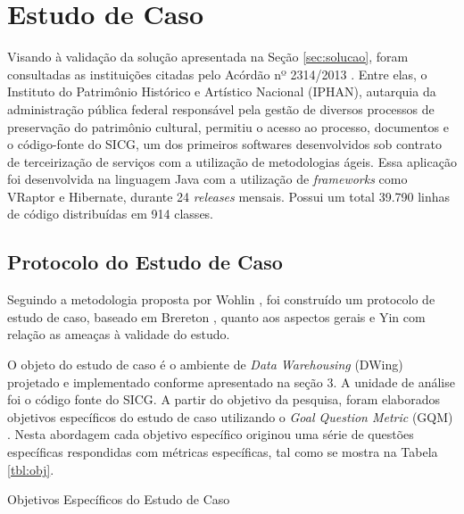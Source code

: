 \section {Estudo de Caso}

Visando à validação da solução apresentada na Seção \ref{sec:solucao}, foram consultadas as instituições citadas pelo Acórdão nº 2314/2013 \cite{TCU:2013}. Entre elas, o Instituto do Patrimônio Histórico e Artístico Nacional (IPHAN), autarquia da administração pública federal responsável pela gestão de diversos processos de preservação do patrimônio cultural, permitiu o acesso ao processo, documentos e o código-fonte do SICG, um dos primeiros softwares desenvolvidos sob contrato de terceirização de serviços com a utilização de metodologias ágeis. Essa aplicação foi desenvolvida na linguagem Java com a utilização de \textit{frameworks} como VRaptor e Hibernate, durante 24 \textit{releases} mensais. Possui um total 39.790 linhas de código distribuídas em 914 classes.

\subsection{Protocolo do Estudo de Caso}
Seguindo a metodologia proposta por Wohlin \cite{wohlin2012experimentation}, foi construído um protocolo de estudo de caso, baseado em Brereton \cite{brereton2008using}, quanto aos aspectos gerais e Yin \cite{yin2011applications} com relação as ameaças à validade do estudo. 

O objeto do estudo de caso é o ambiente de \textit{Data Warehousing} (DWing) projetado e implementado conforme apresentado na seção 3. A unidade de análise foi o código fonte do SICG. A partir do objetivo da pesquisa, foram elaborados objetivos específicos do estudo de caso utilizando o \textit{Goal Question Metric} (GQM) \cite{Basili96b}. Nesta abordagem cada objetivo específico originou uma série de questões específicas respondidas com métricas específicas, tal como se mostra na Tabela \ref{tbl:obj}.

\begin{table}[ht]
\centering
\caption{Objetivos Específicos do Estudo de Caso}
\addtolength{\belowcaptionskip}{6pt}

\label{tbl:obj} 
\end{table}
\FloatBarrier


